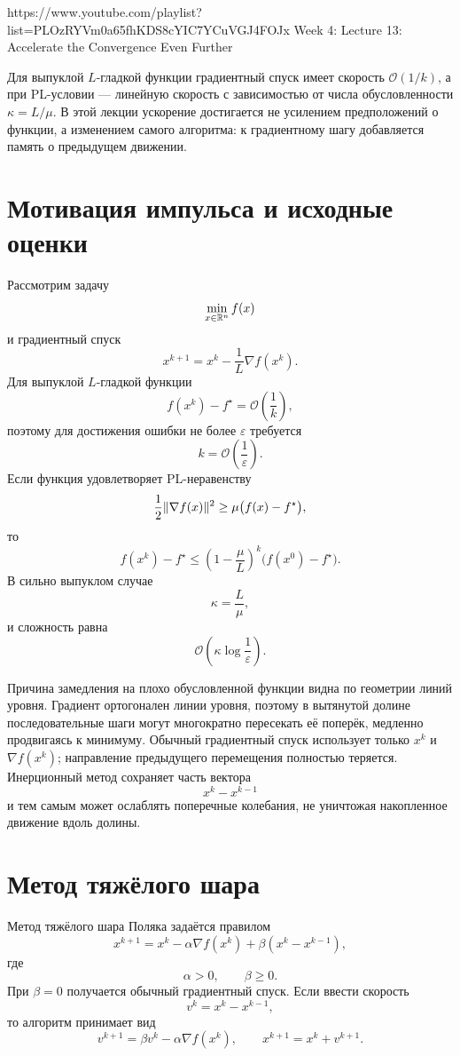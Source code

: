 
\sourcevideo
    {https://www.youtube.com/playlist?list=PLOzRYVm0a65fhKDS8cYIC7YCuVGJ4FOJx}
    {Week 4: Lecture 13: Accelerate the Convergence Even Further}

Для выпуклой \(L\)-гладкой функции градиентный спуск имеет скорость
\(\mathcal O(1/k)\), а при PL-условии --- линейную скорость с
зависимостью от числа обусловленности \(\kappa=L/\mu\). В этой лекции
ускорение достигается не усилением предположений о функции, а
изменением самого алгоритма: к градиентному шагу добавляется память о
предыдущем движении.

\section{Мотивация импульса и исходные оценки}

Рассмотрим задачу
\[
    \min_{x\in\mathbb{R}^n}f(x)
\]
и градиентный спуск
\[
    x^{k+1}=x^k-\frac1L\nabla f(x^k).
\]
Для выпуклой \(L\)-гладкой функции
\[
    f(x^k)-f^\star
    =
    \mathcal O\!\left(\frac1k\right),
\]
поэтому для достижения ошибки не более \(\varepsilon\) требуется
\[
    k
    =
    \mathcal O\!\left(\frac1\varepsilon\right).
\]
Если функция удовлетворяет PL-неравенству
\[
    \frac12\lVert\nabla f(x)\rVert^2
    \ge
    \mu\bigl(f(x)-f^\star\bigr),
\]
то
\[
    f(x^k)-f^\star
    \le
    \left(1-\frac\mu L\right)^k
    \bigl(f(x^0)-f^\star\bigr).
\]
В сильно выпуклом случае
\[
    \kappa=\frac L\mu,
\]
и сложность равна
\[
    \mathcal O\!\left(
        \kappa\log\frac1\varepsilon
    \right).
\]

Причина замедления на плохо обусловленной функции видна по геометрии
линий уровня. Градиент ортогонален линии уровня, поэтому в вытянутой
долине последовательные шаги могут многократно пересекать её поперёк,
медленно продвигаясь к минимуму. Обычный градиентный спуск использует
только \(x^k\) и \(\nabla f(x^k)\); направление предыдущего
перемещения полностью теряется. Инерционный метод сохраняет часть
вектора
\[
    x^k-x^{k-1}
\]
и тем самым может ослаблять поперечные колебания, не уничтожая
накопленное движение вдоль долины.

\section{Метод тяжёлого шара}

Метод тяжёлого шара Поляка задаётся правилом
\[
    x^{k+1}
    =
    x^k
    -
    \alpha\nabla f(x^k)
    +
    \beta(x^k-x^{k-1}),
\]
где
\[
    \alpha>0,
    \qquad
    \beta\ge0.
\]
При \(\beta=0\) получается обычный градиентный спуск. Если ввести
скорость
\[
    v^k=x^k-x^{k-1},
\]
то алгоритм принимает вид
\[
    v^{k+1}
    =
    \beta v^k-\alpha\nabla f(x^k),
    \qquad
    x^{k+1}=x^k+v^{k+1}.
\]

